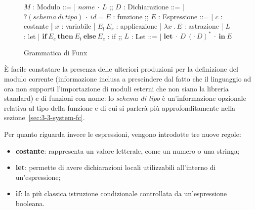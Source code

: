 \newpage

\begin{figure}
    \begin{bnf}
        $M$ : \small{Modulo} ::=
        | $nome\ \cdot\ L$
        ;;
        $D$ : \small{Dichiarazione} ::=
        | $?(schema\ di\ tipo)\ \cdot\ id = E$ : \small{funzione}
        ;;
        $E$ : \small{Espressione} ::=
        | $c$ : \small{costante}
        | $x$ : \small{variabile}
        | $E_l\ E_r$ : \small{applicazione}
        | $\lambda x\ .\ E$ : \small{astrazione}
        | $L$ : \small{let}
        | $\textbf{if}\ E_c\ \textbf{then}\ E_t\ \textbf{else}\ E_e$ : \small{if}
        ;;
        $L$ : \small{Let} ::=
        | $\textbf{let}\ \cdot\ D\ (\cdot\ D)^*\ \cdot\ \textbf{in}\ E$
    \end{bnf}
    \caption{Grammatica di Funx}
    \label{fig:2-3-funx-syntax}
    \vspace{4mm}
\end{figure}

\noindent È facile constatare la presenza delle ulteriori produzioni per la definizione del modulo corrente
(informazione inclusa a prescindere dal fatto che il linguaggio ad ora non supporti l'importazione di moduli esterni
che non siano la libreria standard) e di funzioni con nome: lo \textit{schema di tipo} è un'informazione opzionale
relativa al tipo della funzione e di cui si parlerà più approfonditamente nella sezione~\ref{sec:3-3-system-fc}.

\noindent Per quanto riguarda invece le espressioni, vengono introdotte tre nuove regole:
\begin{itemize}
    \item \textbf{costante}: rappresenta un valore letterale, come un numero o una stringa;
    \item \textbf{let}: permette di avere dichiarazioni locali utilizzabili all'interno di un'espressione;
    \item \textbf{if}: la più classica istruzione condizionale controllata da un'espressione booleana.
\end{itemize}

